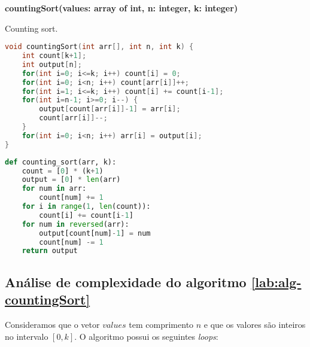\begin{center}
\begin{minipage}{.9\linewidth}
\begin{algorithm}[H]
\DontPrintSemicolon
\textbf{countingSort(values: array of int, n: integer, k: integer)}

\caption{Counting sort.}
\label{lab:alg-countingSort}
\end{algorithm}
\end{minipage}
\end{center}

\vspace{1em}

\begin{lstlisting}[language=C,caption={Counting sort em C},captionpos=t]
void countingSort(int arr[], int n, int k) {
    int count[k+1];
    int output[n];
    for(int i=0; i<=k; i++) count[i] = 0;
    for(int i=0; i<n; i++) count[arr[i]]++;
    for(int i=1; i<=k; i++) count[i] += count[i-1];
    for(int i=n-1; i>=0; i--) {
        output[count[arr[i]]-1] = arr[i];
        count[arr[i]]--;
    }
    for(int i=0; i<n; i++) arr[i] = output[i];
}
\end{lstlisting}

\begin{lstlisting}[language=Python,caption={Counting sort em Python},captionpos=t]
def counting_sort(arr, k):
    count = [0] * (k+1)
    output = [0] * len(arr)
    for num in arr:
        count[num] += 1
    for i in range(1, len(count)):
        count[i] += count[i-1]
    for num in reversed(arr):
        output[count[num]-1] = num
        count[num] -= 1
    return output
\end{lstlisting}

\subsection{Análise de complexidade do algoritmo \ref{lab:alg-countingSort}}

Consideramos que o vetor $values$ tem comprimento $n$ e que os valores são inteiros no intervalo $[0, k]$. O algoritmo possui os seguintes \textit{loops}:

